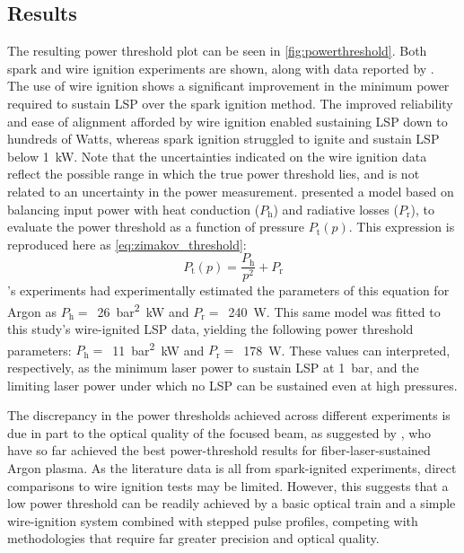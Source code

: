         \subsection{Results}
            The resulting power threshold plot can be seen in \autoref{fig:powerthreshold}. Both spark and wire ignition experiments are shown, along with data reported by \textcite{zimakovInteractionNearIRLaser2016,matsuiGeneratingConditionsArgon2019,luCharacteristicDiagnosticsLaserStabilized2022}. The use of wire ignition shows a significant improvement in the minimum power required to sustain LSP over the spark ignition method. The improved reliability and ease of alignment afforded by wire ignition enabled sustaining LSP down to hundreds of Watts, whereas spark ignition struggled to ignite and sustain LSP below \qty{1}{kW}. Note that the uncertainties indicated on the wire ignition data reflect the possible range in which the true power threshold lies, and is not related to an uncertainty in the power measurement. \textcite{zimakovInteractionNearIRLaser2016} presented a model based on balancing input power with heat conduction ($P_\mathrm{h}$) and radiative losses ($P_\mathrm{r}$), to evaluate the power threshold as a function of pressure $P_\mathrm{t}(p)$. This expression is reproduced here as \autoref{eq:zimakov_threshold}:
            \begin{equation} \label{eq:zimakov_threshold}
                P_\mathrm{t}(p) = \frac{P_\mathrm{h}}{p^2} + P_\mathrm{r}
            \end{equation}
            \citeauthor{zimakovInteractionNearIRLaser2016}'s experiments had experimentally estimated the parameters of this equation for Argon as $P_\mathrm{h} =$~\qty{26}{bar^2.kW} and $P_\mathrm{r} =$~\qty{240}{W}. This same model was fitted to this study's wire-ignited LSP data, yielding the following power threshold parameters: $P_\mathrm{h} =$~\qty{11}{bar^2.kW} and $P_\mathrm{r} =$~\qty{178}{W}. These values can interpreted, respectively, as the minimum laser power to sustain LSP at \qty{1}{bar}, and the limiting laser power under which no LSP can be sustained even at high pressures.

            The discrepancy in the power thresholds achieved across different experiments is due in part to the optical quality of the focused beam, as suggested by \textcite{luCharacteristicDiagnosticsLaserStabilized2022}, who have so far achieved the best power-threshold results for fiber-laser-sustained Argon plasma. As the literature data is all from spark-ignited experiments, direct comparisons to wire ignition tests may be limited. However, this suggests that a low power threshold can be readily achieved by a basic optical train and a simple wire-ignition system combined with stepped pulse profiles, competing with methodologies that require far greater precision and optical quality.

